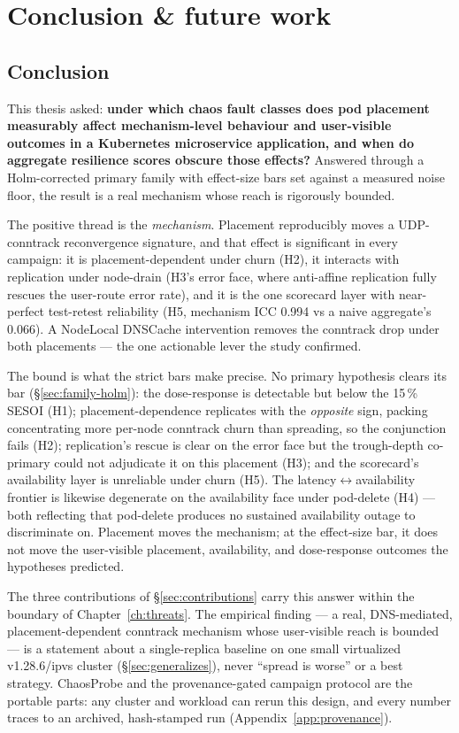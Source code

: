 \chapter{Conclusion \& future work}\label{ch:conclusion}

\section{Conclusion}\label{sec:conclusion}

This thesis asked: \textbf{under which chaos fault classes does pod placement
measurably affect mechanism-level behaviour and user-visible outcomes in a
Kubernetes microservice application, and when do aggregate resilience scores
obscure those effects?} Answered through a Holm-corrected primary family with
effect-size bars set against a measured noise floor, the result is a real
mechanism whose reach is rigorously bounded.

The positive thread is the \emph{mechanism}. Placement reproducibly moves a
UDP-conntrack reconvergence signature, and that effect is significant in every
campaign: it is placement-dependent under churn (H2), it interacts with
replication under node-drain (H3's error face, where anti-affine replication
fully rescues the user-route error rate), and it is the one scorecard layer with
near-perfect test-retest reliability (H5, mechanism ICC 0.994 vs a naive
aggregate's 0.066). A NodeLocal DNSCache intervention removes the conntrack drop
under both placements --- the one actionable lever the study confirmed.

The bound is what the strict bars make precise. No primary hypothesis
clears its bar (\S\ref{sec:family-holm}): the dose-response is
detectable but below the 15\,\% SESOI (H1); placement-dependence replicates with
the \emph{opposite} sign, packing concentrating more per-node conntrack churn
than spreading, so the conjunction fails (H2); replication's rescue is clear on
the error face but the trough-depth co-primary could not adjudicate it on this
placement (H3); and the scorecard's availability layer is unreliable under churn
(H5). The latency$\leftrightarrow$availability frontier is likewise
degenerate on the availability face under pod-delete (H4) --- both reflecting
that pod-delete produces no sustained availability outage to discriminate on. Placement moves the
mechanism; at the effect-size bar, it does not move the user-visible
placement, availability, and dose-response outcomes the hypotheses predicted.

The three contributions of \S\ref{sec:contributions} carry this answer within the
boundary of Chapter~\ref{ch:threats}. The empirical finding --- a real,
DNS-mediated, placement-dependent conntrack mechanism whose user-visible reach is
bounded --- is a statement about a single-replica baseline on one small
virtualized v1.28.6/ipvs cluster (\S\ref{sec:generalizes}), never ``spread is
worse'' or a best strategy. ChaosProbe and the provenance-gated campaign
protocol are the portable parts: any cluster and workload can rerun this design,
and every number traces to an archived, hash-stamped run
(Appendix~\ref{app:provenance}).

